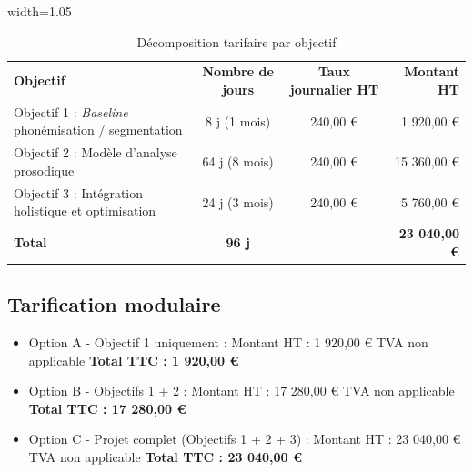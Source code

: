 \documentclass[11pt,a4paper]{article}
\begin{document}
\begin{table}[H]
    \centering
    \begin{adjustbox}{width=1.05\textwidth}
        \begin{tabular}{l|c|c|r}
        \textbf{Objectif} & \textbf{Nombre de jours}& \textbf{Taux journalier HT}& \textbf{Montant HT} \\
        Objectif 1 : \textit{Baseline} phonémisation / segmentation& 8 j (1 mois)& 240,00 €& 1 920,00 €\\
        Objectif 2 : Modèle d'analyse prosodique & 64 j (8 mois)& 240,00 €& 15 360,00 €\\
        Objectif 3 : Intégration holistique et optimisation & 24 j (3 mois)& 240,00 €& 5 760,00 €\\
        \hline
        \textbf{Total} & \textbf{96 j}& & \textbf{23 040,00 €}\\
        \end{tabular}
    \end{adjustbox}
    \caption{Décomposition tarifaire par objectif}
    \label{tab:tarification}
\end{table}

\subsection*{Tarification modulaire}
\begin{itemize}
    \item Option A - Objectif 1 uniquement : \newline
            Montant HT : 1 920,00 € \newline
            TVA non applicable \newline
            \textbf{Total TTC : 1 920,00 €} \newline

    \item Option B - Objectifs 1 + 2 : \newline
            Montant HT : 17 280,00 € \newline
            TVA non applicable \newline
            \textbf{Total TTC : 17 280,00 €} \newline

    \item Option C - Projet complet (Objectifs 1 + 2 + 3) : \newline
            Montant HT : 23 040,00 € \newline
            TVA non applicable \newline
            \textbf{Total TTC : 23 040,00 €} \newline

\end{itemize}
\end{document}
